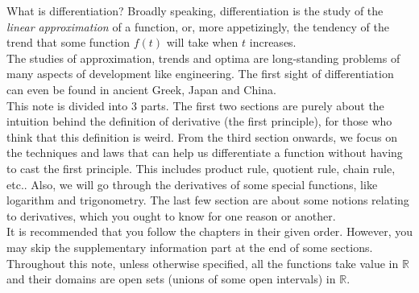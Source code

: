 What is differentiation?
Broadly speaking, differentiation is the study of the \textit{linear approximation} of a function, or, more appetizingly, the tendency of the trend that some function $f(t)$ will take when $t$ increases.\\
The studies of approximation, trends and optima are long-standing problems of many aspects of development like engineering.
The first sight of differentiation can even be found in ancient Greek, Japan and China.\\
This note is divided into 3 parts.
The first two sections are purely about the intuition behind the definition of derivative (the first principle), for those who think that this definition is weird.
From the third section onwards, we focus on the techniques and laws that can help us differentiate a function without having to cast the first principle.
This includes product rule, quotient rule, chain rule, etc..
Also, we will go through the derivatives of some special functions, like logarithm and trigonometry.
The last few section are about some notions relating to derivatives, which you ought to know for one reason or another.\\
It is recommended that you follow the chapters in their given order.
\ifcompilesupp
However, you may skip the supplementary information part at the end of some sections.
\fi
\\
Throughout this note, unless otherwise specified, all the functions take value in $\mathbb R$ and their domains are open sets (unions of some open intervals) in $\mathbb R$.
